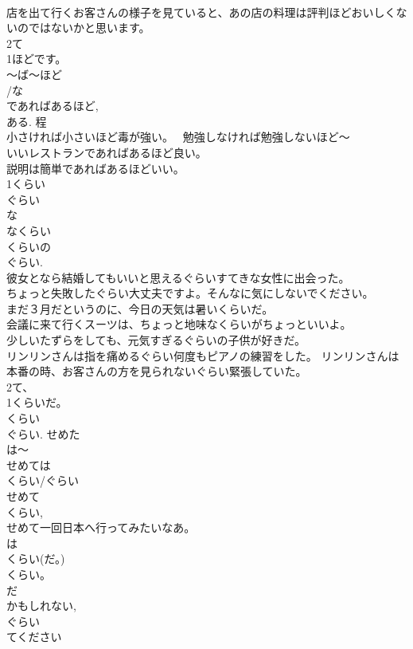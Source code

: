 \documentclass[8pt]{extreport}
\begin{document}
\begin{CJK}{UTF8}{min}
\\	店を出て行くお客さんの様子を見ていると、あの店の料理は評判ほどおいしくないのではないかと思います。 
\\	2て
\\	1ほどです。 
\\	～ば～ほど 
\\	/な
\\	であればあるほど, 
\\	ある. 程　
\\	小さければ小さいほど毒が強い。　 勉強しなければ勉強しないほど～ 
\\	いいレストランであればあるほど良い。 
\\	説明は簡単であればあるほどいい。 
\\	1くらい
\\	ぐらい 
\\	な
\\	なくらい 
\\	くらいの
\\	ぐらい. 
\\	彼女となら結婚してもいいと思えるぐらいすてきな女性に出会った。 
\\	ちょっと失敗したぐらい大丈夫ですよ。そんなに気にしないでください。 
\\	まだ３月だというのに、今日の天気は暑いくらいだ。 
\\	会議に来て行くスーツは、ちょっと地味なくらいがちょっといいよ。 
\\	少しいたずらをしても、元気すぎるぐらいの子供が好きだ。 
\\	リンリンさんは指を痛めるぐらい何度もピアノの練習をした。 リンリンさんは本番の時、お客さんの方を見られないぐらい緊張していた。 
\\	2て、
\\	1くらいだ。 
\\	くらい 
\\	ぐらい. せめた
\\	は～ 
\\	せめては
\\	くらい/ぐらい 
\\	せめて 
\\	くらい, 
\\	せめて一回日本へ行ってみたいなあ。 
\\	は
\\	くらい(だ。) 
\\	くらい。　
\\	だ 
\\	かもしれない, 
\\	ぐらい
\\	てください 

\end{CJK}
\end{document}
